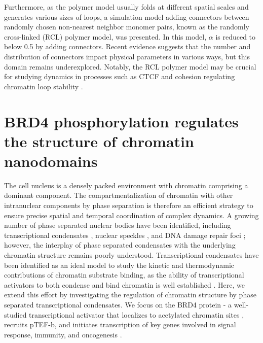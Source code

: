 
Furthermore, as the polymer model usually folds at different spatial scales and generates various sizes of loops, a simulation model adding connectors between randomly chosen non-nearest neighbor monomer pairs, known as the randomly cross-linked (RCL) polymer model, was presented. In this model, $\alpha$ is reduced to below 0.5 by adding connectors. Recent evidence suggests that the number and distribution of connectors impact physical parameters in various ways, but this domain remains underexplored. Notably, the RCL polymer model may be crucial for studying dynamics in processes such as CTCF and cohesion regulating chromatin loop stability \parencite{Hansen2017}.

\clearpage
\section{BRD4 phosphorylation regulates the structure of chromatin nanodomains}

The cell nucleus is a densely packed environment with chromatin comprising a dominant component. The compartmentalization of chromatin with other intranuclear components by phase separation is therefore an efficient strategy to ensure precise spatial and temporal coordination of complex dynamics. A growing number of phase separated nuclear bodies have been identified, including transcriptional condensates \parencite{Sabari2018,Hnisz2017}, nuclear speckles \parencite{Brown2008}, and DNA damage repair foci \parencite{Wang2023}; however, the interplay of phase separated condensates with the underlying chromatin structure remains poorly understood. Transcriptional condensates have been identified as an ideal model to study the kinetic and thermodynamic contributions of chromatin substrate binding, as the ability of transcriptional activators to both condense and bind chromatin is well established \parencite{Sabari2018,Wagh2021,Plys2018,Strom2024,Ma2021}. Here, we extend this effort by investigating the regulation of chromatin structure by phase separated transcriptional condensates. We focus on the BRD4 protein - a well-studied transcriptional activator that localizes to acetylated chromatin sites \parencite{Wu2018}, recruits pTEF-b, and initiates transcription of key genes involved in signal response, immunity, and oncogenesis \parencite{Itzen2014}.

